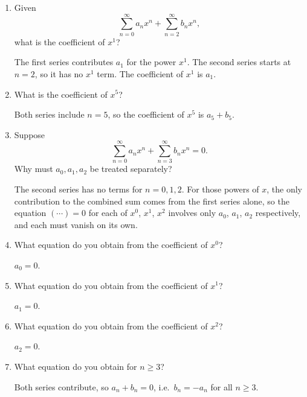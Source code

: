 \documentclass{self-check}
\begin{document}
\begin{enumerate}[leftmargin=*, itemsep=8pt]
  \item Given \[ \sum_{n=0}^{\infty} a_n x^n + \sum_{n=2}^{\infty}
    b_n x^n, \] what is the coefficient of \(x^1\)?
    \begin{answer}
      The first series contributes $a_1$ for the power $x^1$. The
      second series starts at $n = 2$, so it has no $x^1$ term. The
      coefficient of $x^1$ is $a_1$.
    \end{answer}

  \item What is the coefficient of \(x^5\)?
    \begin{answer}
      Both series include $n = 5$, so the coefficient of $x^5$ is $a_5 + b_5$.
    \end{answer}

  \item Suppose \[ \sum_{n=0}^{\infty} a_n x^n + \sum_{n=3}^{\infty}
    b_n x^n =0. \] Why must \(a_0,a_1,a_2\) be treated separately?
    \begin{answer}
      The second series has no terms for $n = 0, 1, 2$. For those
      powers of $x$,
      the only contribution to the combined sum comes from the first
      series alone, so
      the equation $(\cdots) = 0$ for each of $x^0$, $x^1$, $x^2$ involves only
      $a_0$, $a_1$, $a_2$ respectively, and each must vanish on its own.
    \end{answer}

  \item What equation do you obtain from the coefficient of \(x^0\)?
    \begin{answer}
      $a_0 = 0$.
    \end{answer}

  \item What equation do you obtain from the coefficient of \(x^1\)?
    \begin{answer}
      $a_1 = 0$.
    \end{answer}

  \item What equation do you obtain from the coefficient of \(x^2\)?
    \begin{answer}
      $a_2 = 0$.
    \end{answer}

  \item What equation do you obtain for \(n \ge 3\)?
    \begin{answer}
      Both series contribute, so $a_n + b_n = 0$, i.e.\ $b_n = -a_n$ for all
      $n \ge 3$.
    \end{answer}


\end{enumerate}
\end{document}

